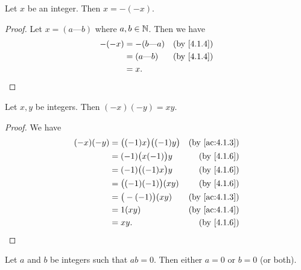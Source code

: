 \begin{ac}\label{ac:4.1.4}
  Let \(x\) be an integer.
  Then \(x = -(-x)\).
\end{ac}

\begin{proof}
  Let \(x = (a \text{---} b)\) where \(a, b \in \mathbb{N}\).
  Then we have
  \begin{align*}
    -(-x) & = -(b \text{---} a) & \text{(by \cref{4.1.4})} \\
          & = (a \text{---} b)  & \text{(by \cref{4.1.4})} \\
          & = x.
  \end{align*}
\end{proof}

\begin{ac}\label{ac:4.1.5}
  Let \(x, y\) be integers.
  Then \((-x)(-y) = xy\).
\end{ac}

\begin{proof}
  We have
  \begin{align*}
    (-x)(-y) & = \big((-1)x\big) \big((-1)y\big) & \text{(by \cref{ac:4.1.3})} \\
             & = (-1)\big(x(-1)\big)y            & \text{(by \cref{4.1.6})}    \\
             & = (-1)\big((-1)x\big)y            & \text{(by \cref{4.1.6})}    \\
             & = \big((-1)(-1)\big)(xy)          & \text{(by \cref{4.1.6})}    \\
             & = \big(-(-1)\big)(xy)             & \text{(by \cref{ac:4.1.3})} \\
             & = 1(xy)                           & \text{(by \cref{ac:4.1.4})} \\
             & = xy.                             & \text{(by \cref{4.1.6})}
  \end{align*}
\end{proof}

\begin{prop}\label{4.1.8}
  Let \(a\) and \(b\) be integers such that \(ab = 0\).
  Then either \(a = 0\) or \(b = 0\) (or both).
\end{prop}

